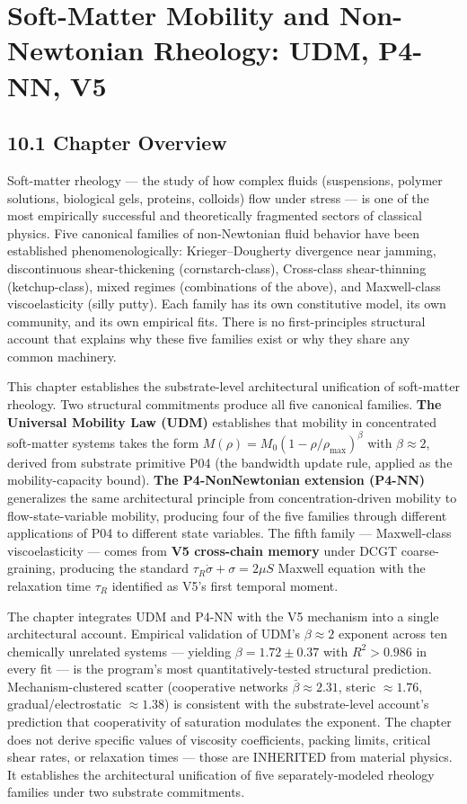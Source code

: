 \documentclass[11pt]{book}
\begin{document}
\newpage


\chapter{Soft-Matter Mobility and Non-Newtonian Rheology: UDM, P4-NN, V5}
\label{chap:10}

\section{10.1 Chapter Overview}

Soft-matter rheology — the study of how complex fluids (suspensions, polymer solutions, biological gels, proteins, colloids) flow under stress — is one of the most empirically successful and theoretically fragmented sectors of classical physics. Five canonical families of non-Newtonian fluid behavior have been established phenomenologically: Krieger–Dougherty divergence near jamming, discontinuous shear-thickening (cornstarch-class), Cross-class shear-thinning (ketchup-class), mixed regimes (combinations of the above), and Maxwell-class viscoelasticity (silly putty). Each family has its own constitutive model, its own community, and its own empirical fits. There is no first-principles structural account that explains why these five families exist or why they share any common machinery.

This chapter establishes the substrate-level architectural unification of soft-matter rheology. Two structural commitments produce all five canonical families. \textbf{The Universal Mobility Law (UDM)} establishes that mobility in concentrated soft-matter systems takes the form $M(\rho) = M_0(1-\rho/\rho_\mathrm{max})^\beta$ with $\beta \approx 2$, derived from substrate primitive P04 (the bandwidth update rule, applied as the mobility-capacity bound). \textbf{The P4-NonNewtonian extension (P4-NN)} generalizes the same architectural principle from concentration-driven mobility to flow-state-variable mobility, producing four of the five families through different applications of P04 to different state variables. The fifth family — Maxwell-class viscoelasticity — comes from \textbf{V5 cross-chain memory} under DCGT coarse-graining, producing the standard $\tau_R \dot\sigma + \sigma = 2\mu S$ Maxwell equation with the relaxation time $\tau_R$ identified as V5's first temporal moment.

The chapter integrates UDM and P4-NN with the V5 mechanism into a single architectural account. Empirical validation of UDM's $\beta \approx 2$ exponent across ten chemically unrelated systems — yielding $\beta = 1.72 \pm 0.37$ with $R^2 > 0.986$ in every fit — is the program's most quantitatively-tested structural prediction. Mechanism-clustered scatter (cooperative networks $\bar\beta \approx 2.31$, steric $\approx 1.76$, gradual/electrostatic $\approx 1.38$) is consistent with the substrate-level account's prediction that cooperativity of saturation modulates the exponent. The chapter does not derive specific values of viscosity coefficients, packing limits, critical shear rates, or relaxation times — those are INHERITED from material physics. It establishes the architectural unification of five separately-modeled rheology families under two substrate commitments.
\end{document}

